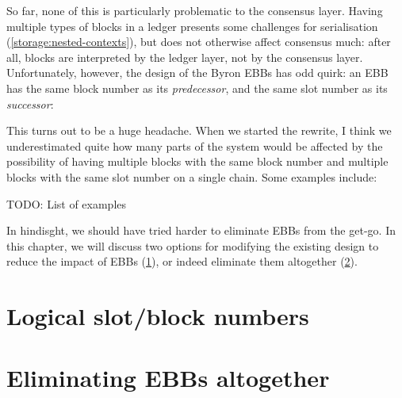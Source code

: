 So far, none of this is particularly problematic to the consensus layer. Having
multiple types of blocks in a ledger presents some challenges for serialisation
(\cref{storage:nested-contexts}), but does not otherwise affect consensus much:
after all, blocks are interpreted by the ledger layer, not by the consensus
layer. Unfortunately, however, the design of the Byron EBBs has odd quirk: an
EBB has the same block number as its \emph{predecessor}, and the same slot
number as its \emph{successor}:
%
\begin{center}
\end{center}
%
This turns out to be a huge headache. When we started the rewrite, I think we
underestimated quite how many parts of the system would be affected by the
possibility of having multiple blocks with the same block number and
multiple blocks with the same slot number on a single chain. Some examples
include:

TODO: List of examples

In hindisght, we should have tried harder to eliminate EBBs from the get-go. In
this chapter, we will discuss two options for modifying the existing design to
reduce the impact of EBBs (\cref{ebbs:logical}), or indeed eliminate them
altogether (\cref{ebbs:elimination}).

\section{Logical slot/block numbers}
\label{ebbs:logical}

\section{Eliminating EBBs altogether}
\label{ebbs:elimination}









